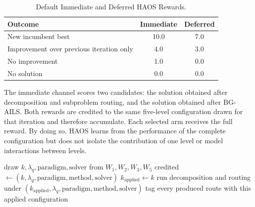 \begin{table}[H]
\centering
\caption{Default Immediate and Deferred HAOS Rewards.}
\label{tab:haos-rewards}
\begin{tabular}{lcc}
\toprule
Outcome & Immediate & Deferred \\
\midrule
New incumbent best & 10.0 & 7.0 \\
Improvement over previous iteration only & 4.0 & 3.0 \\
No improvement & 1.0 & 0.0 \\
No solution & 0.0 & 0.0 \\
\bottomrule
\end{tabular}
\end{table}

The immediate channel scores two candidates: the solution obtained after decomposition and subproblem routing, and the solution obtained after BG-AILS. Both rewards are credited to the same five-level configuration drawn for that iteration and therefore accumulate. Each selected arm receives the full reward. By doing so, HAOS learns from the performance of the complete configuration but does not isolate the contribution of one level or model interactions between levels.

\begin{algorithm}[H]
\DontPrintSemicolon
\LinesNumbered
{}
draw $k, \lambda_q, \mathrm{paradigm}, \mathrm{solver}$ from $W_1, W_2, W_3, W_5$ 
credited $\gets (k, \lambda_q, \mathrm{paradigm}, \mathrm{method}, \mathrm{solver})$ 
$k_{\mathrm{applied}} \gets k$\;
run decomposition and routing under $(k_{\mathrm{applied}}, \lambda_q, \mathrm{paradigm}, \mathrm{method}, \mathrm{solver})$\;
tag every produced route with this applied configuration\;
\caption{HAOS: five-level draw and weight update for one DRI iteration}
\label{alg:haos}
\end{algorithm}

